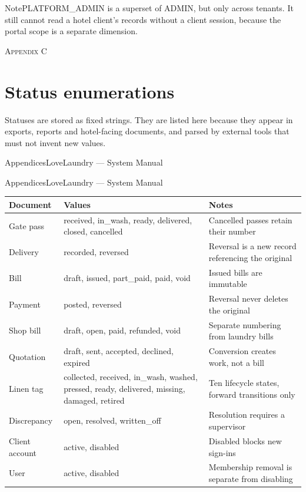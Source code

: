 \documentclass[11pt,a4paper,oneside]{book}
\begin{document}
\begin{notebox}NotePLATFORM\_ADMIN is a superset of ADMIN, but only across tenants. It still cannot read a hotel client's records without a client session, because the portal scope is a separate dimension.\end{notebox}
\textsc{\small\color{crimson}Appendix C}\par\medskip
\section*{Status enumerations}
Statuses are stored as fixed strings. They are listed here because they appear in exports, reports and hotel-facing documents, and parsed by external tools that must not invent new values.

AppendicesLoveLaundry — System Manual

AppendicesLoveLaundry — System Manual

\begin{center}\small
\begin{tabularx}{\linewidth}{|X|X|X|}
\hline
\rowcolor{lightgrey}
\textbf{Document} & \textbf{Values} & \textbf{Notes} \\ \hline
Gate pass & received, in\_wash, ready, delivered, closed, cancelled & Cancelled passes retain their number \\ \hline
Delivery & recorded, reversed & Reversal is a new record referencing the original \\ \hline
Bill & draft, issued, part\_paid, paid, void & Issued bills are immutable \\ \hline
Payment & posted, reversed & Reversal never deletes the original \\ \hline
Shop bill & draft, open, paid, refunded, void & Separate numbering from laundry bills \\ \hline
Quotation & draft, sent, accepted, declined, expired & Conversion creates work, not a bill \\ \hline
Linen tag & collected, received, in\_wash, washed, pressed, ready, delivered, missing, damaged, retired & Ten lifecycle states, forward transitions only \\ \hline
Discrepancy & open, resolved, written\_off & Resolution requires a supervisor \\ \hline
Client account & active, disabled & Disabled blocks new sign-ins \\ \hline
User & active, disabled & Membership removal is separate from disabling \\ \hline
\end{tabularx}
\end{center}
\end{document}
